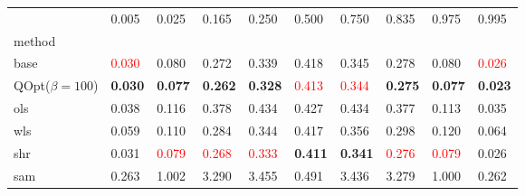 \begin{tabular}{llllllllll}
\toprule
 & 0.005 & 0.025 & 0.165 & 0.250 & 0.500 & 0.750 & 0.835 & 0.975 & 0.995 \\
method &  &  &  &  &  &  &  &  &  \\
\midrule
base & \textcolor{red}{0.030} & 0.080 & 0.272 & 0.339 & 0.418 & 0.345 & 0.278 & 0.080 & \textcolor{red}{0.026} \\
\midrule
QOpt($\beta=100$) & \textbf{0.030} & \textbf{0.077} & \textbf{0.262} & \textbf{0.328} & \textcolor{red}{0.413} & \textcolor{red}{0.344} & \textbf{0.275} & \textbf{0.077} & \textbf{0.023} \\
ols & 0.038 & 0.116 & 0.378 & 0.434 & 0.427 & 0.434 & 0.377 & 0.113 & 0.035 \\
wls & 0.059 & 0.110 & 0.284 & 0.344 & 0.417 & 0.356 & 0.298 & 0.120 & 0.064 \\
shr & 0.031 & \textcolor{red}{0.079} & \textcolor{red}{0.268} & \textcolor{red}{0.333} & \textbf{0.411} & \textbf{0.341} & \textcolor{red}{0.276} & \textcolor{red}{0.079} & 0.026 \\
sam & 0.263 & 1.002 & 3.290 & 3.455 & 0.491 & 3.436 & 3.279 & 1.000 & 0.262 \\
\bottomrule
\end{tabular}